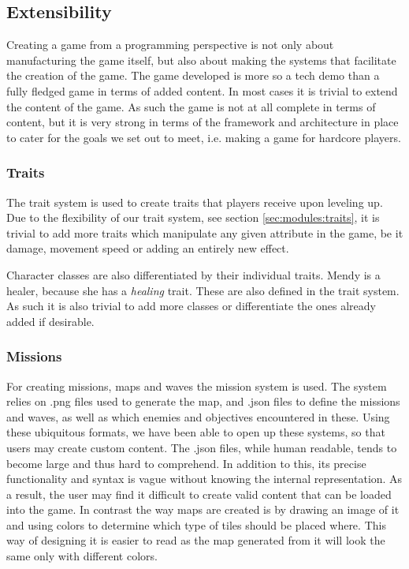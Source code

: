 \subsection{Extensibility}
Creating a game from a programming perspective is not only about manufacturing the game itself, but also about making the systems that facilitate the creation of the game.
The game developed is more so a tech demo than a fully fledged game in terms of added content.
In most cases it is trivial to extend the content of the game. 
As such the game is not at all complete in terms of content, but it is very strong in terms of the framework and architecture in place to cater for the goals we set out to meet, i.e. making a game for hardcore players.

\subsubsection{Traits}\label{dicsussion:traits}
The trait system is used to create traits that players receive upon leveling up.
Due to the flexibility of our trait system, see section \ref{sec:modules:traits}, it is trivial to add more traits which manipulate any given attribute in the game, be it damage, movement speed or adding an entirely new effect. 

Character classes are also differentiated by their individual traits.
Mendy is a healer, because she has a \emph{healing} trait.
These are also defined in the trait system.
As such it is also trivial to add more classes or differentiate the ones already added if desirable.

\subsubsection{Missions}\label{dicsussion:missions}
For creating missions, maps and waves the mission system is used.
The system relies on .png files used to generate the map, and .json files to define the missions and waves, as well as which enemies and objectives encountered in these.
Using these ubiquitous formats, we have been able to open up these systems, so that users may create custom content.
The .json files, while human readable, tends to become large and thus hard to comprehend.
In addition to this, its precise functionality and syntax is vague without knowing the internal representation.
As a result, the user may find it difficult to create valid content that can be loaded into the game.
In contrast the way maps are created is by drawing an image of it and using colors to determine which type of tiles should be placed where. This way of designing it is easier to read as the map generated from it will look the same only with different colors.

